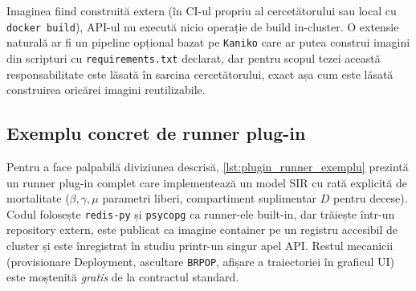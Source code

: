 

Imaginea fiind construită extern (în CI-ul propriu al cercetătorului sau
local cu \texttt{docker build}), API-ul nu execută nicio operație de build
in-cluster. O extensie naturală ar fi un pipeline opțional bazat pe
\texttt{Kaniko} care ar putea construi imagini din scripturi cu
\texttt{requirements.txt} declarat, dar pentru scopul tezei această
responsabilitate este lăsată în sarcina cercetătorului, exact așa cum este
lăsată construirea oricărei imagini reutilizabile.

\subsection{Exemplu concret de runner plug-in}
\label{subsec:plugin_exemplu}

Pentru a face palpabilă diviziunea descrisă, \cref{lst:plugin_runner_exemplu}
prezintă un runner plug-in complet care implementează un model SIR cu rată
explicită de mortalitate ($\beta, \gamma, \mu$ \textendash{} parametri
liberi, compartiment suplimentar $D$ pentru decese). Codul folosește
\texttt{redis-py} și \texttt{psycopg} ca runner-ele built-in, dar trăiește
într-un repository extern, este publicat ca imagine container pe un registru
accesibil de cluster și este înregistrat în studiu printr-un singur apel
API. Restul mecanicii (provisionare Deployment, ascultare \texttt{BRPOP},
afișare a traiectoriei în graficul UI) este moștenită \emph{gratis} de la
contractul standard.


